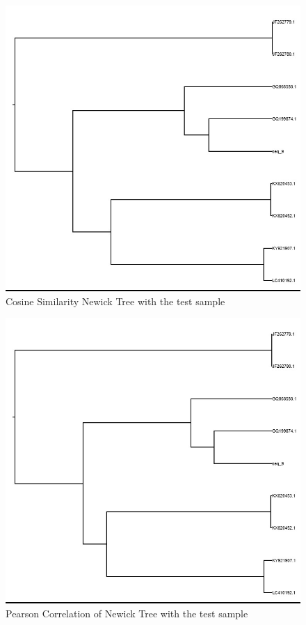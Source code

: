 \documentclass[10pt]{article}
\begin{document}
\begin{figure}[htbp]
    \centering
    \includegraphics[width=\textwidth]{figures/cosine_candidate.jpeg}
    \caption{Cosine Similarity Newick Tree with the test sample}
\end{figure}

\begin{figure}[htbp]
    \centering
    \includegraphics[width=\textwidth]{figures/pearson_candidate.jpeg}
    \caption{Pearson Correlation of Newick Tree with the test sample}
\end{figure}
\newpage
\end{document}

